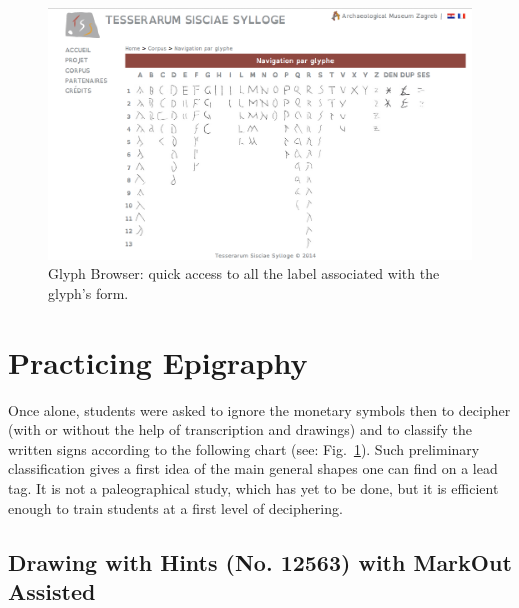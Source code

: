 \documentclass[amsthm,ebook]{saparticle}
\begin{document}
\begin{figure}[!htp]
\centering
\includegraphics[width=\columnwidth]{4_glyphs.png}
\caption{Glyph Browser: quick access to all the label associated with the glyph's form.}
\label{fig:table1}
\end{figure}

\section{Practicing Epigraphy}

Once alone, students were asked to ignore the monetary symbols then to decipher (with or without the help of
transcription and drawings) and to classify the written signs according to the following chart (see: Fig.~\ref{fig:table1}). Such preliminary
classification gives a first idea of the main general shapes one can find on a lead tag. It is not a paleographical
study, which has yet to be done, but it is efficient enough to train students at a first level of deciphering.





\subsection{Drawing with Hints (No. 12563) with MarkOut Assisted}
\end{document}

